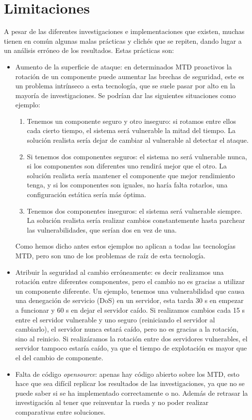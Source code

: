 \section{Limitaciones}\label{limitaciones}
A pesar de las diferentes investigaciones e implementaciones que existen, muchas tienen en común algunas malas prácticas y clichés que se repiten, dando lugar a un análisis erróneo de los resultados. Estas prácticas son:
\begin{itemize}
    \item \label{limit:superficie}Aumento de la superficie de ataque: en determinados MTD proactivos la rotación de un componente puede aumentar las brechas de seguridad\cite{MTD-critica}, este es un problema intrínseco a esta tecnología, que se suele pasar por alto en la mayoría de investigaciones. Se podrían dar las siguientes situaciones como ejemplo:
    \begin{enumerate}
        \item Tenemos un componente seguro y otro inseguro: si rotamos entre ellos cada cierto tiempo, el sistema será vulnerable la mitad del tiempo. La solución realista sería dejar de cambiar al vulnerable al detectar el ataque.
        \item Si tenemos dos componentes seguros: el sistema no será vulnerable nunca, si los componentes son diferentes uno rendirá mejor que el otro. La solución realista sería mantener el componente que mejor rendimiento tenga, y si los componentes son iguales, no haría falta rotarlos, una configuración estática sería más óptima.
        \item Tenemos dos componentes inseguros: el sistema será vulnerable siempre. La solución realista sería realizar cambios constantemente hasta parchear las vulnerabilidades, que serían dos en vez de una.
    \end{enumerate}
    Como hemos dicho antes estos ejemplos no aplican a todas las tecnologías MTD, pero son uno de los problemas de raíz de esta tecnología.
    \item \label{limit:wrong_security}Atribuir la seguridad al cambio erróneamente: es decir realizamos una rotación entre diferentes componentes, pero el cambio no es gracias a utilizar un componente diferente. Un ejemplo, tenemos una vulnerabilidad que causa una denegación de servicio (DoS) en un servidor, esta tarda 30 s en empezar a funcionar y 60 s en dejar el servidor caído. Si realizamos cambios cada 15 s entre el servidor vulnerable y uno seguro (reiniciando el servidor al cambiarlo), el servidor nunca estará caído, pero no es gracias a la rotación, sino al reinicio. Si realizáramos la rotación entre dos servidores vulnerables, el servidor tampoco estaría caído, ya que el tiempo de explotación es mayor que el del cambio de componente.
    \item \label{limit:opensource}Falta de código \textit{opensource}: apenas hay código abierto sobre los MTD, esto hace que sea difícil replicar los resultados de las investigaciones, ya que no se puede saber si se ha implementado correctamente o no. Además de retrasar la investigación al tener que reinventar la rueda y no poder realizar comparativas entre soluciones.
\end{itemize}

